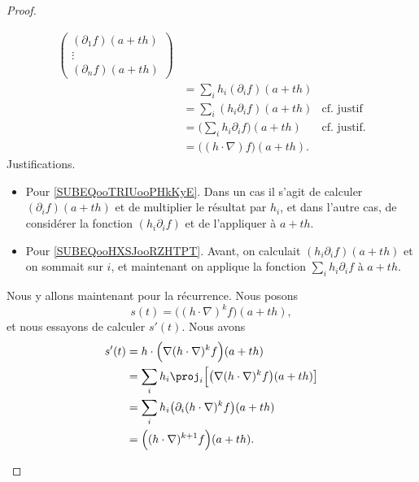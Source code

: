 \begin{proof}
\begin{subproof}
\begin{subequations}
\begin{align}
				\begin{pmatrix}
					(\partial_1f)(a+th) \\
					\vdots              \\
					(\partial_nf)(a+th)
				\end{pmatrix}                                                                                                     \\
				                             & = \sum_ih_i(\partial_if)(a+th)                                                           \\
				                             & =\sum_i(h_i\partial_if)(a+th)           & \text{cf. justif}	\label{SUBEQooTRIUooPHkKyE}   \\
				                             & =\big( \sum_ih_i\partial_if \big)(a+th) & \text{cf. justif.} \label{SUBEQooHXSJooRZHTPT} \\
				                             & = \big( (h\cdot \nabla)f \big)(a+th).
			\end{align}
		\end{subequations}
		Justifications.
		\begin{itemize}
			\item
			      Pour \eqref{SUBEQooTRIUooPHkKyE}. Dans un cas il s'agit de calculer \( (\partial_if)(a+th)\) et de multiplier le résultat par \( h_i\), et dans l'autre cas, de considérer la fonction \( (h_i\partial_if)\) et de l'appliquer à \( a+th\).
			\item
			      Pour \eqref{SUBEQooHXSJooRZHTPT}. Avant, on calculait \( (h_i\partial_if)(a+th)\) et on sommait sur \( i\), et maintenant on applique la fonction \( \sum_ih_i\partial_if\) à \( a+th\).
		\end{itemize}
		Nous y allons maintenant pour la récurrence. Nous posons
		\begin{equation}
			s(t)=\big( (h\cdot\nabla)^kf \big)(a+th),
		\end{equation}
		et nous essayons de calculer \( s'(t)\). Nous avons
		\begin{subequations}
			\begin{align}
				s'(t) & =h\cdot\Big( \nabla(h\cdot \nabla)^kf \Big)(a+th)                          \\
				      & =\sum_ih_i\proj_i\Big[   \big( \nabla(h\cdot\nabla)^kf \big)(a+th)   \big] \\
				      & =\sum_ih_i\big( \partial_i(h\cdot \nabla)^kf \big)(a+th)                   \\
				      & =\Big( (h\cdot\nabla)^{k+1}f \Big)(a+th).

\end{align}
\end{subequations}
\end{subproof}
\end{proof}
